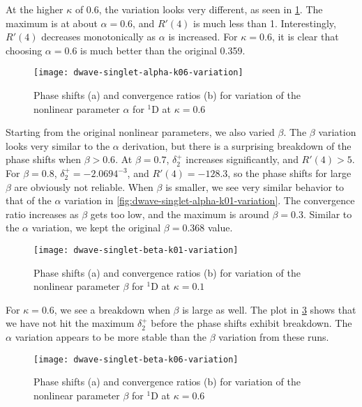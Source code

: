 \documentclass[Dissertation.tex]{subfiles}
\begin{document}
At the higher $\kappa$ of 0.6, the variation looks very different, as seen in
\cref{fig:dwave-singlet-alpha-k06-variation}. The maximum is at about
$\alpha = 0.6$, and $R'(4)$ is much less than 1. Interestingly,
$R'(4)$ decreases monotonically as $\alpha$ is increased. For
$\kappa = 0.6$, it is clear that choosing $\alpha = 0.6$ is much better than
the original 0.359.

\begin{figure}
	\centering
	\texttt{[image: dwave-singlet-alpha-k06-variation]}
	\caption[Variation of the nonlinear parameter $\alpha$ for $^{1}$D at $\kappa = 0.6$]{Phase shifts (a) and convergence ratios (b) for variation of the nonlinear parameter $\alpha$ for $^{1}$D at $\kappa = 0.6$}
	\label{fig:dwave-singlet-alpha-k06-variation}
\end{figure}

Starting from the original nonlinear parameters, we also varied $\beta$. The
$\beta$ variation looks very similar to the $\alpha$ derivation, but there is
a surprising breakdown of the phase shifts when $\beta > 0.6$. At $\beta = 0.7$,
$\delta_2^+$ increases significantly, and $R'(4) > 5$. For $\beta = 0.8$,
$\delta_2^+ = -2.0694^{-3}$, and $R'(4) = -128.3$, so the phase shifts
for large $\beta$ are obviously not reliable. When $\beta$ is smaller, we see
very similar behavior to that of the $\alpha$ variation in
\cref{fig:dwave-singlet-alpha-k01-variation}. The convergence ratio increases as
$\beta$ gets too low, and the maximum is around $\beta = 0.3$. Similar to the
$\alpha$ variation, we kept the original $\beta = 0.368$ value.

\begin{figure}
	\centering
	\texttt{[image: dwave-singlet-beta-k01-variation]}
	\caption[Variation of the nonlinear parameter $\beta$ for $^{1}$D at $\kappa = 0.1$]{Phase shifts (a) and convergence ratios (b) for variation of the nonlinear parameter $\beta$ for $^{1}$D at $\kappa = 0.1$}
	\label{fig:dwave-singlet-beta-k01-variation}
\end{figure}

For $\kappa = 0.6$, we see a breakdown when $\beta$ is large as well. The plot
in \cref{fig:dwave-singlet-beta-k06-variation} shows that we have not hit the maximum
$\delta_2^+$ before the phase shifts exhibit breakdown. The $\alpha$ variation
appears to be more stable than the $\beta$ variation from these runs.

\begin{figure}
	\centering
	\texttt{[image: dwave-singlet-beta-k06-variation]}
	\caption[Variation of the nonlinear parameter $\beta$ for $^{1}$D at $\kappa = 0.6$]{Phase shifts (a) and convergence ratios (b) for variation of the nonlinear parameter $\beta$ for $^{1}$D at $\kappa = 0.6$}
	\label{fig:dwave-singlet-beta-k06-variation}
\end{figure}
\end{document}
